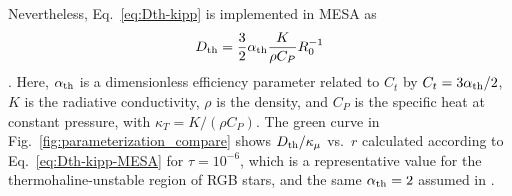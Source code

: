 Nevertheless, Eq.~\eqref{eq:Dth-kipp} is implemented in MESA as
\begin{equation} \label{eq:Dth-kipp-MESA}
    \Dth = \frac{3}{2} \alpha_{\rm{th}} \frac{K}{\rho C_P}R_0^{-1}
\end{equation}
\citep[see Eq.~(14) of][]{mesa2}. 
Here, $\alpha_{\rm{th}}$ is a dimensionless efficiency parameter related to $C_t$ by $C_t = 3\alpha_{\rm{th}}/2$, $K$ is the radiative conductivity, $\rho$ is the density, and $C_P$ is the specific heat at constant pressure, with $\kappa_T = K/(\rho C_P)$. 
The green curve in Fig.~\ref{fig:parameterization_compare} shows $D_\mathrm{th}/\kappa_\mu$ vs.~$r$ calculated according to Eq.~\eqref{eq:Dth-kipp-MESA} for $\tau = 10^{-6}$, which is a representative value for the thermohaline-unstable region of RGB stars, and the same $\alpha_{\rm{th}} = 2$ assumed in \citet{CantielloLanger2010}.

